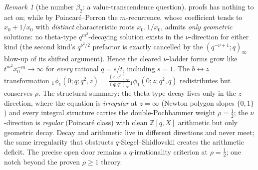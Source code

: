 \documentclass[11pt]{article}
\theoremstyle{plain}
\theoremstyle{definition}
\theoremstyle{remark}
\newtheorem{remark}[theorem]{Remark}
\newcommand{\Z}{\mathbb{Z}}
\begin{document}
\begin{remark}[the number $\beta_2$: a value-transcendence question]
proofs has nothing to act on; while by Poincar\'e--Perron \cite{Poincare1885,Perron1909} the $m$-recurrence, whose coefficient tends
to $x_0+1/x_0$ with \emph{distinct} characteristic roots $x_0,1/x_0$, admits \emph{only geometric}
solutions: no theta-type $q^{m^2}$-decaying solution exists in the $\nu$-direction for either kind (the
second kind's $q^{\nu^2/2}$ prefactor is exactly cancelled by the $(q^{-\nu+1};q)_\infty$ blow-up of its
shifted argument). Hence the cleared $\nu$-ladder forms grow like $t^{m^2}x_0^{-m}\to\infty$ for
\emph{every} rational $q=s/t$, including $s=1$. The $b\leftrightarrow z$ transformation
${}_1\phi_1(0;q;q^2,z)=\frac{(z;q^2)_\infty}{(q;q^2)_\infty}{}_1\phi_1(0;z;q^2,q)$ redistributes but
conserves $\rho$. The structural summary: the theta-type decay lives only in the $z$-direction, where
the equation is \emph{irregular} at $z=\infty$ (Newton polygon slopes $\{0,1\}$) and every integral
structure carries the double-Pochhammer weight $\rho=\tfrac12$; the $\nu$-direction is \emph{regular}
(Poincar\'e class) with clean $\Z[q,X]$ arithmetic but only geometric decay. Decay and arithmetic live
in different directions and never meet; the same irregularity that obstructs $q$-Siegel--Shidlovskii
creates the arithmetic deficit. The precise open door remains a $q$-irrationality criterion at
$\rho=\tfrac12$; one notch beyond the proven $\rho\ge1$ theory.
\end{remark}
\end{document}
